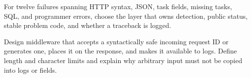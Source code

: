 \begin{exercise}
For twelve failures spanning HTTP syntax, JSON, task fields, missing tasks, SQL,
and programmer errors, choose the layer that owns detection, public status, stable
problem code, and whether a traceback is logged.
\end{exercise}

\begin{exercise}
Design middleware that accepts a syntactically safe incoming request ID or
generates one, places it on the response, and makes it available to logs. Define
length and character limits and explain why arbitrary input must not be copied
into logs or fields.
\end{exercise}

